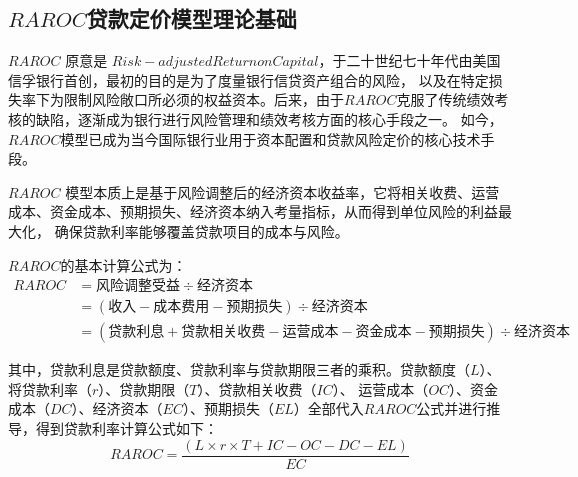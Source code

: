 \documentclass[withoutpreface,bwprint]{cumcmthesis}
\begin{document}
    \subsection{$RAROC$贷款定价模型理论基础}
        $RAROC$ \cite{doi:10.1111/j.1745-6622.1996.tb00117.x}原意是 $Risk - adjusted Return on Capital$，于二十世纪七十年代由美国信孚银行首创，最初的目的是为了度量银行信贷资产组合的风险，
        以及在特定损失率下为限制风险敞口所必须的权益资本。后来，由于$RAROC$克服了传统绩效考核的缺陷，逐渐成为银行进行风险管理和绩效考核方面的核心手段之一。
        如今，$RAROC$模型已成为当今国际银行业用于资本配置和贷款风险定价的核心技术手段。\par
        $RAROC$ 模型\cite{段翀2019}本质上是基于风险调整后的经济资本收益率，它将相关收费、运营成本、资金成本、预期损失、经济资本纳入考量指标，从而得到单位风险的利益最大化，
        确保贷款利率能够覆盖贷款项目的成本与风险。\par
        $RAROC$的基本计算公式为：
        \begin{equation*}
            \begin{split}
            RAROC &= \text{风险调整受益} \div \text{经济资本} \\
                  &= (\text{收入} - \text{成本费用} - \text{预期损失}) \div \text{经济资本} \\
                  &= (\text{贷款利息} + \text{贷款相关收费} - \text{运营成本} - \text{资金成本} - \text{预期损失}) \div \text{经济资本}
            \end{split}
        \end{equation*}\par
        其中，贷款利息是贷款额度、贷款利率与贷款期限三者的乘积。贷款额度（$L$）、将贷款利率（$r$）、贷款期限（$T$）、贷款相关收费（$IC$）、
        运营成本（$OC$）、资金成本（$DC$）、经济资本（$EC$）、预期损失（$EL$）全部代入$RAROC$公式并进行推导，得到贷款利率计算公式如下：
        \begin{equation}
            RAROC = \frac{(L \times r \times T + IC - OC - DC - EL)}{EC}
        \end{equation}
\end{document}
